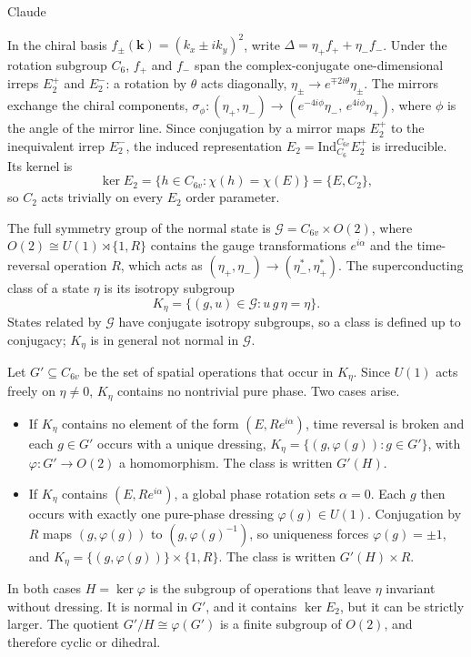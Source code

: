 \documentclass[aps,prb,twocolumn,superscriptaddress,nofootinbib]{revtex4-2}
\begin{document}
Claude

In the chiral basis $f_\pm(\mathbf k) = (k_x \pm i k_y)^2$, write
$\Delta = \eta_+ f_+ + \eta_- f_-$. Under the rotation subgroup $C_6$,
$f_+$ and $f_-$ span the complex-conjugate one-dimensional irreps
$E_2^{+}$ and $E_2^{-}$: a rotation by $\theta$ acts diagonally,
$\eta_\pm \to e^{\mp 2i\theta}\eta_\pm$. The mirrors exchange the chiral
components, $\sigma_\phi : (\eta_+, \eta_-) \to
(e^{-4i\phi}\eta_-,\, e^{4i\phi}\eta_+)$, where $\phi$ is the angle of the
mirror line. Since conjugation by a mirror maps $E_2^+$ to the
inequivalent irrep $E_2^-$, the induced representation
$E_2 = \mathrm{Ind}_{C_6}^{C_{6v}} E_2^+$ is irreducible. Its kernel is
\begin{equation}
  \ker E_2 = \{ h \in C_{6v} : \chi(h) = \chi(E) \} = \{E, C_2\},
\end{equation}
so $C_2$ acts trivially on every $E_2$ order parameter.

The full symmetry group of the normal state is
$\mathcal G = C_{6v} \times O(2)$, where
$O(2) \cong U(1) \rtimes \{1, R\}$ contains the gauge transformations
$e^{i\alpha}$ and the time-reversal operation $R$, which acts as
$(\eta_+, \eta_-) \to (\eta_-^*, \eta_+^*)$. The superconducting class of
a state $\eta$ is its isotropy subgroup
\begin{equation}
  K_\eta = \{ (g, u) \in \mathcal G : u\, g\, \eta = \eta \}.
\end{equation}
States related by $\mathcal G$ have conjugate isotropy subgroups, so a
class is defined up to conjugacy; $K_\eta$ is in general not normal in
$\mathcal G$.

Let $G' \subseteq C_{6v}$ be the set of spatial operations that occur in
$K_\eta$. Since $U(1)$ acts freely on $\eta \neq 0$, $K_\eta$ contains no
nontrivial pure phase. Two cases arise.
\begin{itemize}
  \item If $K_\eta$ contains no element of the form $(E, Re^{i\alpha})$,
  time reversal is broken and each $g \in G'$ occurs with a unique
  dressing, $K_\eta = \{ (g, \varphi(g)) : g \in G' \}$, with
  $\varphi : G' \to O(2)$ a homomorphism. The class is written $G'(H)$.
  \item If $K_\eta$ contains $(E, Re^{i\alpha})$, a global phase rotation
  sets $\alpha = 0$. Each $g$ then occurs with exactly one pure-phase
  dressing $\varphi(g) \in U(1)$. Conjugation by $R$ maps
  $(g, \varphi(g))$ to $(g, \varphi(g)^{-1})$, so uniqueness forces
  $\varphi(g) = \pm 1$, and
  $K_\eta = \{ (g, \varphi(g)) \} \times \{1, R\}$. The class is
  written $G'(H) \times R$.
\end{itemize}
In both cases $H = \ker\varphi$ is the subgroup of operations that leave
$\eta$ invariant without dressing. It is normal in $G'$, and it contains
$\ker E_2$, but it can be strictly larger. The quotient
$G'/H \cong \varphi(G')$ is a finite subgroup of $O(2)$, and therefore
cyclic or dihedral.
\end{document}
